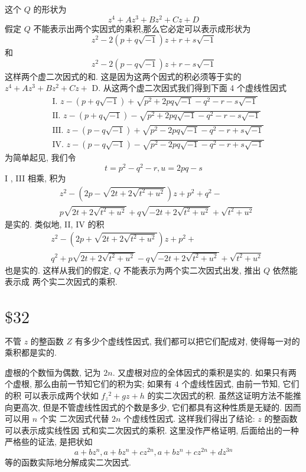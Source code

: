 这个 $Q$ 的形状为
\[
z^{4}+A z^{3}+B z^{2}+C z+D
\]
假定 $Q$ 不能表示出两个实因式的乘积,那么它必定可以表示成形状为
\[
z^{2}-2(p+q \sqrt{-1}) z+r+s \sqrt{-1}
\]
和
\[
z^{2}-2(p-q \sqrt{-1}) z+r-s \sqrt{-1}
\]
这样两个虚二次因式的和. 这是因为这两个因式的积必须等于实的 $z^{4}+A z^{3}+B z^{2}+C z+$ D. 从这两个虚二次因式我们得到下面 4 个虚线性因式
\[
\begin{aligned}
& \text { I. } z-(p+q \sqrt{-1})+\sqrt{p^{2}+2 p q \sqrt{-1}-q^{2}-r-s \sqrt{-1}} \\
& \text { II. } z-(p+q \sqrt{-1})-\sqrt{p^{2}+2 p q \sqrt{-1}-q^{2}-r-s \sqrt{-1}} \\
& \text { III. } z-(p-q \sqrt{-1})+\sqrt{p^{2}-2 p q \sqrt{-1}-q^{2}-r+s \sqrt{-1}} \\
& \text { IV. } z-(p-q \sqrt{-1})-\sqrt{p^{2}-2 p q \sqrt{-1}-q^{2}-r+s \sqrt{-1}}
\end{aligned}
\]
为简单起见, 我们令
\[
t=p^{2}-q^{2}-r, u=2 p q-s
\]
I , III 相乘, 积为
\[
\begin{aligned}
& z^{2}-\left(2 p-\sqrt{2 t+2 \sqrt{t^{2}+u^{2}}}\right) z+p^{2}+q^{2}- \\
& p \sqrt{2 t+2 \sqrt{t^{2}+u^{2}}}+q \sqrt{-2 t+2 \sqrt{t^{2}+u^{2}}}+\sqrt{t^{2}+u^{2}}
\end{aligned}
\]
是实的. 类似地, II, IV 的积
\[
\begin{aligned}
& z^{2}-\left(2 p+\sqrt{2 t+2 \sqrt{t^{2}+u^{2}}}\right) z+p^{2}+ \\
& q^{2}+p \sqrt{2 t+2 \sqrt{t^{2}+u^{2}}}-q \sqrt{-2 t+2 \sqrt{t^{2}+u^{2}}}+\sqrt{t^{2}+u^{2}}
\end{aligned}
\]
也是实的. 这样从我们的假定, $Q$ 不能表示为两个实二次因式出发, 推出 $Q$ 依然能表示成 两个实二次因式的乘积.

\section{$\$ 32$}

不管 $z$ 的整函数 $Z$ 有多少个虚线性因式, 我们都可以把它们配成对, 使得每一对的乘积都是实的.

虚根的个数恒为偶数, 记为 $2 n$. 又虚根对应的全体因式的乘积是实的. 如果只有两 个虚根, 那么由前一节知它们的积为实; 如果有 4 个虚线性因式, 由前一节知, 它们的积 可以表示成两个状如 $f_{z}{ }^{2}+g z+h$ 的实二次因式的积. 虽然这证明方法不能推向更高次, 但是不管虚线性因式的个数是多少, 它们都具有这种性质是无疑的. 因而可以用 $n$ 个实 二次因式代替 $2 n$ 个虚线性因式. 这样我们得出了结论: $z$ 的整函数可以表示成实线性因 式和实二次因式的乘积. 这里没作严格证明, 后面给出的一种严格些的证法, 是把状如
\[
a+b z^{n}, a+b z^{n}+c z^{2 n}, a+b z^{n}+c z^{2 n}+d z^{3 n}
\]
等的函数实际地分解成实二次因式.

